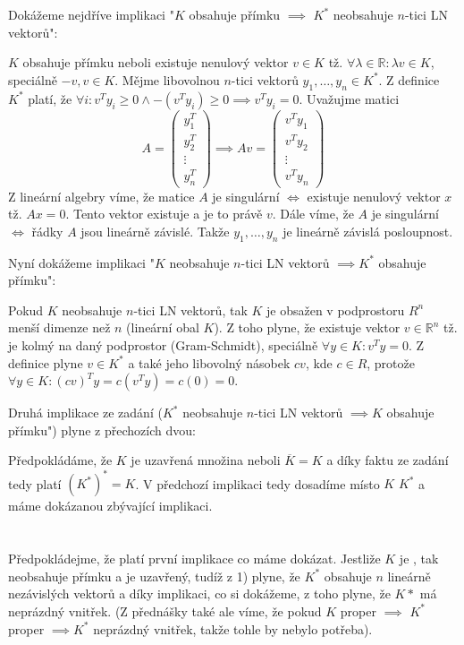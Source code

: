 \documentclass[12pt, a4paper]{article}
\begin{document}
\section{}
Dokážeme nejdříve implikaci "$K$ obsahuje přímku $\implies$ $K^*$ neobsahuje $n$-tici LN vektorů":

$K$ obsahuje přímku neboli existuje nenulový vektor $v \in K$ tž. $\forall \lambda \in \mathbb{R}: \lambda v \in K$, speciálně $-v,v \in K$. Mějme libovolnou $n$-tici vektorů $y_1,\dots,y_n \in K^*$. Z definice $K^*$ platí, že $\forall i: v^T y_i \geq 0 \land -(v^Ty_i) \geq 0 \implies v^Ty_i = 0$. Uvažujme matici
\[
A = \begin{pmatrix}
y_1^T\\
y_2^T\\
\vdots\\
y_n^T
\end{pmatrix} \implies Av = \begin{pmatrix}
v^Ty_1\\
v^Ty_2\\
\vdots\\
v^Ty_n
\end{pmatrix}
\]
Z lineární algebry víme, že matice $A$ je singulární $\iff$ existuje nenulový vektor $x$ tž. $Ax=0$. Tento vektor existuje a je to právě $v$. Dále víme, že $A$ je singulární $\iff$ řádky $A$ jsou lineárně závislé. Takže $y_1,\dots,y_n$ je lineárně závislá posloupnost.

Nyní dokážeme implikaci "$K$ neobsahuje $n$-tici LN vektorů $\implies K^*$ obsahuje přímku":

Pokud $K$ neobsahuje $n$-tici LN vektorů, tak $K$ je obsažen v podprostoru $R^n$ menší dimenze než $n$ (lineární obal $K$). Z toho plyne, že existuje vektor $v \in \mathbb{R}^n$ tž. je kolmý na daný podprostor (Gram-Schmidt), speciálně $\forall y \in K: v^T y = 0$. Z definice plyne $v \in K^*$ a také jeho libovolný násobek $cv$, kde $c \in R$, protože $\forall y \in K: (cv)^Ty = c(v^Ty) = c(0) = 0$.

Druhá implikace ze zadání ($K^*$ neobsahuje $n$-tici LN vektorů $\implies K$ obsahuje přímku") plyne z přechozích dvou:

Předpokládáme, že $K$ je uzavřená množina neboli $\overline{K} = K$ a díky faktu ze zadání tedy platí $(K^*)^* = K$. V předchozí implikaci tedy dosadíme místo $K$ $K^*$ a máme dokázanou zbývající implikaci.

\section{}
Předpokládejme, že platí první implikace co máme dokázat. Jestliže $K$ je , tak neobsahuje přímku a je uzavřený, tudíž z 1) plyne, že $K^*$ obsahuje $n$ lineárně nezávislých vektorů a díky implikaci, co si dokážeme, z toho plyne, že $K*$ má neprázdný vnitřek. (Z přednášky také ale víme, že pokud $K$ proper $\implies$ $K^*$ proper $\implies K^*$ neprázdný vnitřek, takže tohle by nebylo potřeba).
\end{document}
